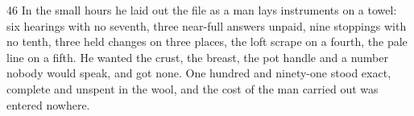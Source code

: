 \begin{CRchronicle}{46}
In the small hours he laid out the file as a man lays instruments on a towel: six hearings with no seventh, three near-full answers unpaid, nine stoppings with no tenth, three held changes on three places, the loft scrape on a fourth, the pale line on a fifth. He wanted the crust, the breast, the pot handle and a number nobody would speak, and got none. One hundred and ninety-one stood exact, complete and unspent in the wool, and the cost of the man carried out was entered nowhere.
\end{CRchronicle}
